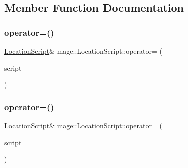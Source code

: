 \subsection{Member Function Documentation}
\hypertarget{classmage_1_1_location_script_a49409b091dbd1b93830c46831be453fb}{}\label{classmage_1_1_location_script_a49409b091dbd1b93830c46831be453fb} 
\subsubsection{\texorpdfstring{operator=()}{operator=()}\hspace{0.1cm}{\footnotesize\ttfamily [1/2]}}
{\footnotesize\ttfamily \hyperlink{classmage_1_1_location_script}{Location\+Script}\& mage\+::\+Location\+Script\+::operator= (\begin{DoxyParamCaption}\item[{const \hyperlink{classmage_1_1_location_script}{Location\+Script} \&}]{script }\end{DoxyParamCaption})\hspace{0.3cm}{\ttfamily [delete]}}

\hypertarget{classmage_1_1_location_script_a6e2ad5cd12a984d38c66bbcc81fef94b}{}\label{classmage_1_1_location_script_a6e2ad5cd12a984d38c66bbcc81fef94b} 
\subsubsection{\texorpdfstring{operator=()}{operator=()}\hspace{0.1cm}{\footnotesize\ttfamily [2/2]}}
{\footnotesize\ttfamily \hyperlink{classmage_1_1_location_script}{Location\+Script}\& mage\+::\+Location\+Script\+::operator= (\begin{DoxyParamCaption}\item[{\hyperlink{classmage_1_1_location_script}{Location\+Script} \&\&}]{script }\end{DoxyParamCaption})\hspace{0.3cm}{\ttfamily [delete]}}

\hypertarget{classmage_1_1_location_script_a3ffe0474c573e2cf858aee62056324a3}{}\label{classmage_1_1_location_script_a3ffe0474c573e2cf858aee62056324a3} 
